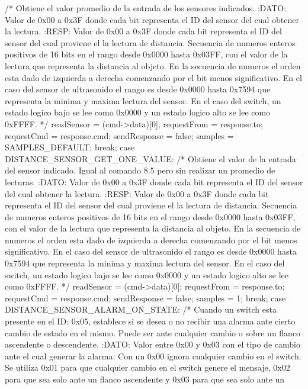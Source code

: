 {\begin{verbatimtab}
{{			/* Obtiene el valor promedio de la entrada de los sensores indicados.
			:DATO:
			Valor de 0x00 a 0x3F donde cada bit representa el ID del sensor
			del cual obtener la lectura.
			:RESP:
			Valor de 0x00 a 0x3F donde cada bit representa el ID del sensor
			del cual proviene el la lectura de distancia. Secuencia de numeros enteros
			positivos de 16 bits en el rango desde 0x0000 hasta 0x03FF, con el valor de
			la lectura que representa la distancia al objeto. En la secuencia de numeros
			el orden esta dado de izquierda a derecha comenzando por el bit menos
			significativo.
			En el caso del sensor de ultrasonido el rango es desde 0x0000 hasta 0x7594
			que representa la minima y maxima lectura del sensor.
			En el caso del switch, un estado logico bajo se lee como 0x0000 y un estado
			logico alto se lee como 0xFFFF.
			*/
			readSensor = (cmd->data)[0];
			requestFrom = 	response.to;
			requestCmd = response.cmd;
			sendResponse = false;
			samples = SAMPLES_DEFAULT;
		break;
 		case DISTANCE_SENSOR_GET_ONE_VALUE:
			/* Obtiene el valor de la entrada del sensor indicado. Igual al comando 8.5 pero
			sin realizar un promedio de lecturas.
			:DATO:
			Valor de 0x00 a 0x3F donde cada bit representa el ID del sensor
			del cual obtener la lectura.
			:RESP:
			Valor de 0x00 a 0x3F donde cada bit representa el ID del sensor
			del cual proviene el la lectura de distancia. Secuencia de numeros enteros
			positivos de 16 bits en el rango desde 0x0000 hasta 0x03FF, con el valor de
			la lectura que representa la distancia al objeto. En la secuencia de numeros
			el orden esta dado de izquierda a derecha comenzando por el bit menos
			significativo.
			En el caso del sensor de ultrasonido el rango es desde 0x0000 hasta 0x7594
			que representa la minima y maxima lectura del sensor.
			En el caso del switch, un estado logico bajo se lee como 0x0000 y un estado
			logico alto se lee como 0xFFFF.
			*/
			readSensor = (cmd->data)[0];
			requestFrom = 	response.to;
			requestCmd = response.cmd;
			sendResponse = false;
			samples = 1;
		break;
		case DISTANCE_SENSOR_ALARM_ON_STATE:
			/* Cuando un switch esta presente en el ID: 0x05, establece si se desea o no
			recibir una alarma ante cierto cambio de estado en el mismo. Puede ser ante
			cualquier cambio o sobre un flanco ascendente o descendente.
			:DATO:
			Valor entre 0x00 y 0x03 con el tipo de cambio ante el cual generar
			la alarma. Con un 0x00 ignora cualquier cambio en el switch. Se utiliza
			0x01 para que cualquier cambio en el switch genere el mensaje, 0x02 para
			que sea solo ante un flanco ascendente y 0x03 para que sea solo ante un
}}
\end{verbatimtab}}
